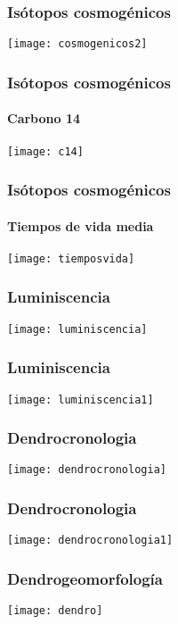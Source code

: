 \documentclass{beamer}
\begin{document}
\begin{frame}
\frametitle{Isótopos cosmogénicos}
\centering
\texttt{[image: cosmogenicos2]}
\end{frame}
\begin{frame}
\frametitle{Isótopos cosmogénicos}
\framesubtitle{Carbono 14}
\centering
\texttt{[image: c14]}
\end{frame}
\begin{frame}
\frametitle{Isótopos cosmogénicos}
\framesubtitle{Tiempos de vida media}
\centering
\texttt{[image: tiemposvida]}
\end{frame}
\begin{frame}
\frametitle{Luminiscencia}
\centering
\texttt{[image: luminiscencia]}
\end{frame}
\begin{frame}
\frametitle{Luminiscencia}
\centering
\texttt{[image: luminiscencia1]}
\end{frame}
\begin{frame}
\frametitle{Dendrocronologia}
\centering
\texttt{[image: dendrocronologia]}
\end{frame}
\begin{frame}
\frametitle{Dendrocronologia}
\centering
\texttt{[image: dendrocronologia1]}
\end{frame}
\begin{frame}
\frametitle{Dendrogeomorfología}
\centering
\texttt{[image: dendro]}
\end{frame}
\end{document}
